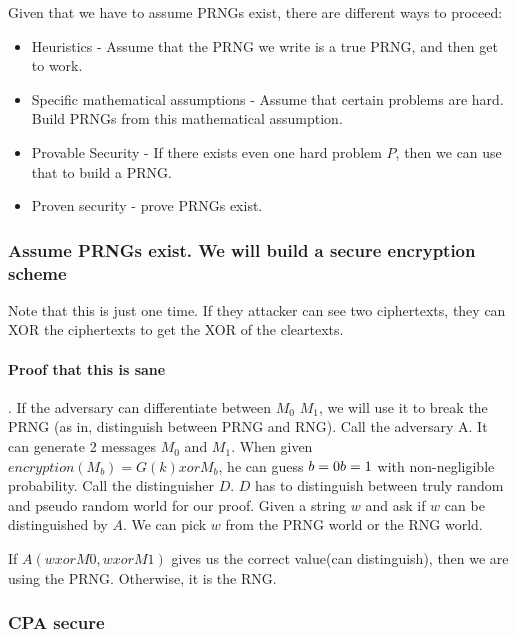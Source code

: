 Given that we have to assume PRNGs exist, there are different ways to proceed:
\begin{itemize}
\item Heuristics - Assume that the PRNG we write is a true PRNG, and then get to work.
\item Specific mathematical assumptions - Assume that certain problems are hard. Build PRNGs from this mathematical assumption.
\item Provable Security - If there exists even one hard problem $P$, then we can use that to build a PRNG.
\item Proven security - prove PRNGs exist.
\end{itemize}


\subsubsection{Assume PRNGs exist. We will build a secure encryption scheme}



Note that this is just one time. If they attacker can see two ciphertexts, they can XOR the ciphertexts to get the XOR of the cleartexts.

\paragraph{Proof that this is sane}.
If the adversary can differentiate between $M_0$ $M_1$, we will use it to break the PRNG (as in, distinguish between PRNG and RNG).
Call the adversary A. It can generate 2 messages $M_0$ and $M_1$. When given $encryption(M_b) = G(k) xor M_b$, he can guess $b = 0 \/ b = 1$ with non-negligible probability.
Call the distinguisher $D$. $D$ has to distinguish between truly random and pseudo random world for our proof.
Given a string $w$ and ask if $w$ can be distinguished by $A$. We can pick $w$ from the PRNG world or the RNG world.

If $A(w xor M0, w xor M1)$ gives us the  correct value(can distinguish), then we are using the PRNG. Otherwise, it is the RNG.


\subsubsection{CPA secure}

